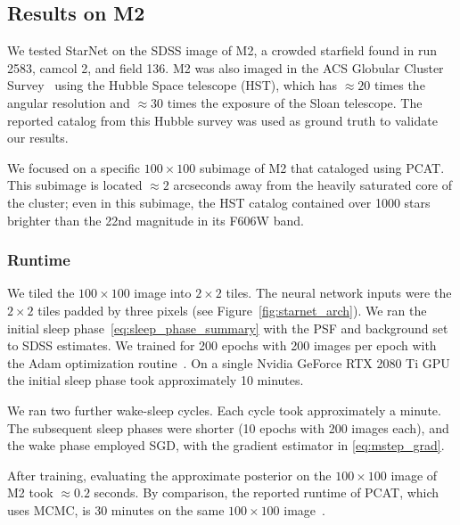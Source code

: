 \subsection{Results on M2}
We tested StarNet on the SDSS image of M2, a crowded starfield found in run 2583, camcol 2, and field 136.
M2 was also imaged in the ACS Globular Cluster Survey~\cite{Sarajedini_2007}
using the Hubble Space telescope (HST),
which has $\approx20$ times the angular resolution and $\approx30$ times the exposure of the Sloan telescope. The reported catalog from this Hubble survey was used as ground truth to 
validate our results.

We focused on a specific $100 \times 100$ subimage of M2 that \cite{Portillo_2017, Feder_2019} cataloged using PCAT.
This subimage is located $\approx2$ arcseconds away from the heavily saturated core of the cluster;
even in this subimage, the HST catalog contained over 1000 stars brighter than the 22nd magnitude in its F606W band.

\subsubsection{Runtime} 
\label{sec:runtime}
We tiled the $100\times 100$ image into $2\times 2$ tiles. The neural network inputs were the $2\times2$ tiles padded by three pixels (see Figure~\ref{fig:starnet_arch}). 
We ran the initial sleep phase~\eqref{eq:sleep_phase_summary}
with the PSF and background set to SDSS estimates. We trained for 200 epochs with 200 images per epoch with  
the Adam optimization routine~\cite{kingma2014adam}. 
On a single Nvidia GeForce RTX 2080 Ti GPU 
the initial sleep phase took approximately 10 minutes. 

We ran two further wake-sleep cycles. Each cycle took approximately a minute. The subsequent sleep phases were shorter (10 epochs with 200 images each), and the wake phase employed SGD, with the gradient estimator in \eqref{eq:mstep_grad}. 

After training, evaluating the approximate posterior on the $100 \times 100$ image of M2 took $\approx 0.2$ seconds. 
By comparison, the reported runtime of PCAT, which uses MCMC, is 30 minutes on the same $100 \times 100$ image~\cite{Feder_2019}. 

